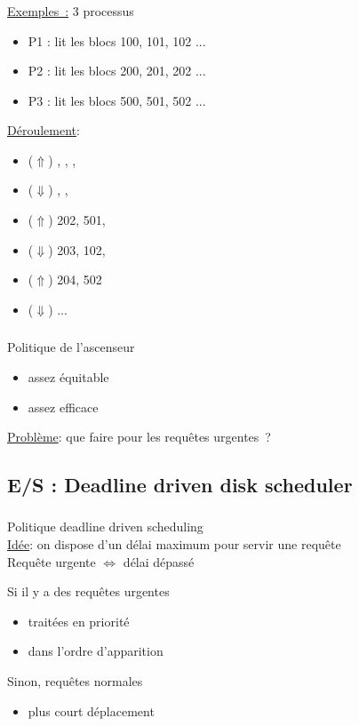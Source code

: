 \begin{frame}
  \frametitle{\insertsubsection}
  \underline{Exemples~:} 3 processus
  \begin{itemize}
  \item P1 : lit les blocs 100, 101, 102 ...
  \item P2 : lit les blocs 200, 201, 202 ...
  \item P3 : lit les blocs 500, 501, 502 ...
  \end{itemize}
  \vspace{0.5cm} \pause
  \underline{Déroulement}:
  \begin{itemize}
  \item \pause ($\Uparrow$) , , , 
  \item \pause ($\Downarrow$) , , 
  \item \pause ($\Uparrow$) 202, 501,
  \item \pause  ($\Downarrow$) 203, 102,
  \item \pause ($\Uparrow$) 204, 502  
  \item ($\Downarrow$) ...
  \end{itemize}
\end{frame}

\begin{frame}
  \frametitle{\insertsubsection}
  \large
  Politique de l'ascenseur
  \begin{itemize}
  \item \alert{assez équitable}
  \item \alert{assez efficace}
  \end{itemize}
  
  \vspace{0.5cm}
  \underline{Problème}: que faire pour les \alert{requêtes urgentes}~?
  \normalsize
\end{frame}

\subsection{E/S : Deadline driven disk scheduler}
\begin{frame}
\frametitle{\insertsubsection}
Politique \alert{deadline driven scheduling}\\
\vspace{0.2cm}
\underline{Idée}: on dispose d'un \alert{délai maximum} pour servir une requête\\
\vspace{0.5cm}
Requête urgente $\Leftrightarrow$ délai dépassé
\vspace{0.5cm}

Si il y a des requêtes \alert{urgentes} 
\begin{itemize}
\item traitées en priorité
\item \alert{dans l'ordre d'apparition}
\end{itemize}
Sinon, requêtes normales
\begin{itemize}
\item  \alert{plus court déplacement}
\end{itemize}
\end{frame}

